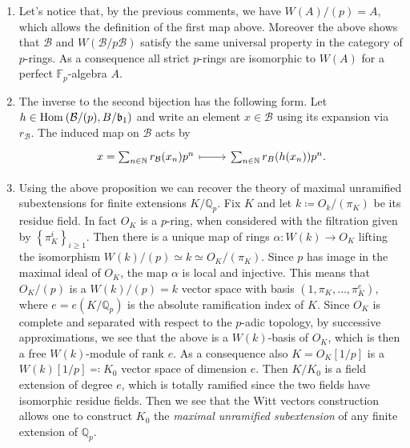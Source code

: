 \begin{rem}[]\leavevmode\vspace{-.2\baselineskip}
\begin{enumerate}
\item Let's notice that, by the previous comments, we have
	$W(A)/ (p) = A$, which allows the definition of the first map above.
	Moreover the above shows that $\mathcal{B}$ and $W(\mathcal{B}/p \mathcal{B})$
	satisfy the same universal property in the category of $p$-rings.
	As a consequence all strict $p$-rings are isomorphic to $W(A)$ for
	a perfect $\mathbb{F}_p$-algebra $A$.

\item The inverse to the second bijection has the following form.
	Let $h \in \operatorname{Hom}_{  } \left( \mathcal{B}/ (p), B/\mathfrak{b}_1 \right)$
	and write an element $x \in \mathcal{B}$ using its expansion via $r_{\mathcal{B}}$.
	The induced map on $\mathcal{B}$ acts by
	\begin{equation*}
	\begin{tikzcd}[row sep = 0ex
		,/tikz/column 1/.append style={anchor=base east}
		,/tikz/column 2/.append style={anchor=base west}]
		x = \sum_{n \in \mathbb{N} }^{  } r_{\mathcal{B}}(x_n) p^n 
		\arrow[r, "", mapsto] & 
		\sum_{n \in \mathbb{N} }^{  } r_B(h(x_n)) p^n
	.\end{tikzcd}
	\end{equation*} 

\item Using the above proposition we can recover the theory of maximal unramified
	subextensions for finite extensions $K/\mathbb{Q}_p$.
	Fix $K$ and let $k \coloneqq O_k/ (\pi_K)$ be its residue field.
	In fact $O_K$ is a $p$-ring, when considered with the filtration
	given by $\left\{ \pi_K^i \right\}_{i \geq 1}$.
	Then there is a unique map of rings $\alpha\colon W(k) \to O_K$
	lifting the isomorphism $W(k)/ (p) \simeq k \simeq O_K/ (\pi_K)$.
	Since $p$ has image in the maximal ideal of $O_K$,
	the map $\alpha$ is local and injective.
	This means that $O_K/ (p)$ is a $W(k)/ (p) = k$ vector space
	with basis $\left(1, \pi_K, \ldots, \pi_K^e\right)$,
	where $e = e(K/\mathbb{Q}_p)$ is the absolute ramification
	index of $K$.
	Since $O_K$ is complete and separated with respect to the $p$-adic topology,
	by successive approximations, we see that the above is a
	$W(k)$-basis of $O_K$, which is then a free $W(k)$-module
	of rank $e$.
	As a consequence also $K = O_K[1/p]$ is a $W(k)[1/p] \eqqcolon K_0$
	vector space of dimension $e$.
	Then $K/K_0$ is a field extension of degree $e$, which is totally ramified
	since the two fields have isomorphic residue fields.
	Then we see that the Witt vectors construction allows one to
	construct $K_0$ the \emph{maximal unramified subextension} of any
	finite extension of $\mathbb{Q}_p$.


\end{enumerate}
\end{rem}
